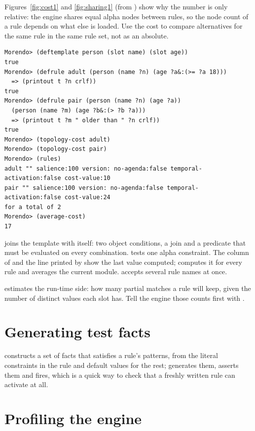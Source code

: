 Figures~\ref{fig:cost1} and \ref{fig:sharing1} (from ) show why
the number is only relative: the engine shares equal alpha nodes between
rules, so the node count of a rule depends on what else is loaded. Use the
cost to compare alternatives for the same rule in the same rule set, not
as an absolute.

\begin{lstlisting}[style=shell]
Morendo> (deftemplate person (slot name) (slot age))
true
Morendo> (defrule adult (person (name ?n) (age ?a&:(>= ?a 18)))
  => (printout t ?n crlf))
true
Morendo> (defrule pair (person (name ?n) (age ?a))
  (person (name ?m) (age ?b&:(> ?b ?a)))
  => (printout t ?m " older than " ?n crlf))
true
Morendo> (topology-cost adult)
Morendo> (topology-cost pair)
Morendo> (rules)
adult "" salience:100 version: no-agenda:false temporal-activation:false cost-value:10
pair "" salience:100 version: no-agenda:false temporal-activation:false cost-value:24
for a total of 2
Morendo> (average-cost)
17
\end{lstlisting}

 joins the  template with itself: two object
conditions, a join and a predicate that must be evaluated on every
combination.  tests one alpha constraint. The
 column of  and the 
line printed by  show the last value computed;
 computes it for every rule and
 averages the current module. 
accepts several rule names at once.

 estimates the run-time side: how many partial
matches a rule will keep, given the number of distinct values each slot
has. Tell the engine those counts first with
.

\section{Generating test facts}

 constructs a set of facts that satisfies a
rule's patterns, from the literal constraints in the rule and default
values for the rest;  generates them, asserts them and
fires, which is a quick way to check that a freshly written rule can
activate at all.

\section{Profiling the engine}


